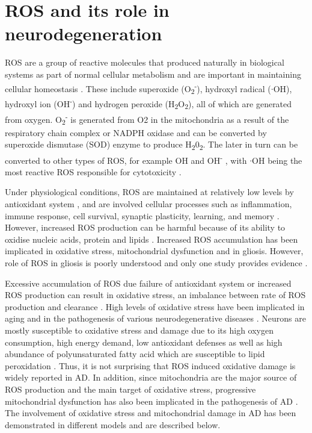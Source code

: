 \section{ROS and its role in neurodegeneration}
ROS are a group of reactive molecules that produced naturally in biological systems as part of normal cellular metabolism and are important in maintaining cellular homeostasis \citep{Cenini2019}. These include superoxide (O\textsubscript{2}\textsuperscript{-}), hydroxyl radical ($\cdot$OH), hydroxyl ion (OH\textsuperscript{-}) and hydrogen peroxide (H\textsubscript{2}O\textsubscript{2}), all of which are generated from oxygen. O\textsubscript{2}\textsuperscript{-} is generated from O2 in the mitochondria as a result of the respiratory chain complex or NADPH oxidase and can be converted by superoxide dismutase (SOD) enzyme to produce H\textsubscript{2}0\textsubscript{2}. The later  in turn can be converted to other types of ROS, for example OH and OH\textsuperscript{-} \citep{Kim2015a}, with $\cdot$OH being the most reactive ROS responsible for cytotoxicity \citep{Bolisetty2013}.

Under physiological conditions, ROS are maintained at relatively low levels by antioxidant system \citep{Dasuri2013,Gandhi2012}, and are involved cellular processes such as inflammation, immune response, cell survival, synaptic plasticity, learning, and memory \citep{Cenini2019,Kishida2007,Liu2017}. However, increased ROS production can be harmful because of its ability to oxidise nucleic acids, protein and lipids \citep{Wang2014}. Increased ROS accumulation has been implicated in oxidative stress, mitochondrial dysfunction and in gliosis. However, role of ROS in gliosis is poorly understood and only one study provides evidence \citep{Kishida2007}.

Excessive accumulation of ROS due failure of antioxidant system or increased ROS production can result in oxidative stress, an imbalance between rate of ROS production and clearance \citep{Wang2014}. High levels of oxidative stress have been implicated in aging and in the pathogenesis of various neurodegenerative diseases \citep{Bonda2010,Cenini2019,Liu2017,Shibata2008}. Neurons are mostly susceptible to oxidative stress and damage due to its high oxygen consumption, high energy demand, low antioxidant defenses as well as high abundance of polyunsaturated fatty acid which are susceptible to lipid peroxidation \citep{Cobley2018}. Thus, it is not surprising that ROS induced oxidative damage is widely reported in AD. In addition, since mitochondria are the major source of ROS production and the main target of oxidative stress, progressive mitochondrial dysfunction has also been implicated in the pathogenesis of AD \citep{Swerdlow2007}. The involvement of oxidative stress and mitochondrial damage in AD has been demonstrated in different models and are described below. 

